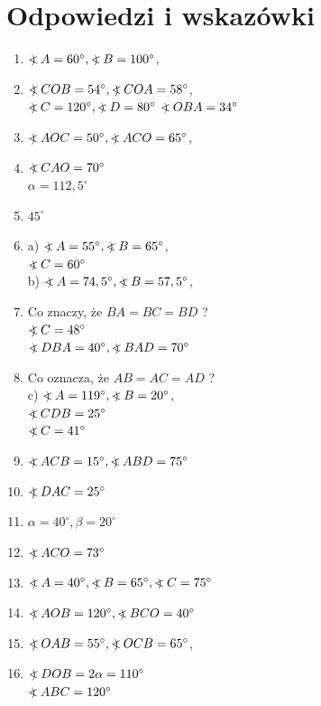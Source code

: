 \documentclass[10pt]{article}
\newcommand\Varangle{\mathop{{<\!\!\!\!\!\text{\small)}}\:}\nolimits}
\begin{document}
\section*{Odpowiedzi i wskazówki}
\begin{enumerate}
  \item \(\Varangle A=60^{\circ}, \Varangle B=100^{\circ}\),
  \item \(\Varangle C O B=54^{\circ}, \Varangle C O A=58^{\circ}\),\\
\(\Varangle C=120^{\circ}, \Varangle D=80^{\circ}\) \(\Varangle O B A=34^{\circ}\)
  \item \(\Varangle A O C=50^{\circ}, \Varangle A C O=65^{\circ}\),
  \item \(\Varangle C A O=70^{\circ}\)\\
\(\alpha=112,5^{\circ}\)
  \item \(45^{\circ}\)
  \item a) \(\Varangle A=55^{\circ}, \Varangle B=65^{\circ}\),\\
\(\Varangle C=60^{\circ}\)\\
b) \(\Varangle A=74,5^{\circ}, \Varangle B=57,5^{\circ}\),
  \item Co znaczy, że \(B A=B C=B D\) ?\\
\(\Varangle C=48^{\circ}\)\\
\(\Varangle D B A=40^{\circ}, \Varangle B A D=70^{\circ}\)
  \item Co oznacza, że \(A B=A C=A D\) ?\\
c) \(\Varangle A=119^{\circ}, \Varangle B=20^{\circ}\),\\
\(\Varangle C D B=25^{\circ}\)\\
\(\Varangle C=41^{\circ}\)
  \item \(\Varangle A C B=15^{\circ}, \Varangle A B D=75^{\circ}\)
  \item \(\Varangle D A C=25^{\circ}\)
  \item \(\alpha=40^{\circ}, \beta=20^{\circ}\)
  \item \(\Varangle A C O=73^{\circ}\)
  \item \(\Varangle A=40^{\circ}, \Varangle B=65^{\circ}, \Varangle C=75^{\circ}\)
  \item \(\Varangle A O B=120^{\circ}, \Varangle B C O=40^{\circ}\)
  \item \(\Varangle O A B=55^{\circ}, \Varangle O C B=65^{\circ}\),
  \item \(\Varangle D O B=2 \alpha=110^{\circ}\)\\
\(\Varangle A B C=120^{\circ}\)

\end{enumerate}
\end{document}
